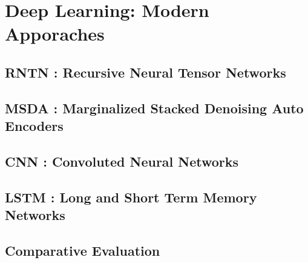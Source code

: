 \chapter{Deep Learning: Modern Apporaches}\label{chapter:modernapproach}

\section{RNTN : Recursive Neural Tensor Networks}
\section{MSDA : Marginalized Stacked Denoising Auto Encoders}
\section{CNN : Convoluted Neural Networks}
\section{LSTM : Long and Short Term Memory Networks}
\section{Comparative Evaluation}